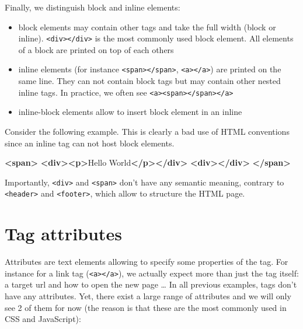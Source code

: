 \documentclass[
]{book}
\newenvironment{Shaded}{\begin{snugshade}}{\end{snugshade}}
\newcommand{\KeywordTok}[1]{\textcolor[rgb]{0.13,0.29,0.53}{\textbf{#1}}}
\newcommand{\NormalTok}[1]{#1}
\providecommand{\tightlist}{%
  \setlength{\itemsep}{0pt}\setlength{\parskip}{0pt}}
\begin{document}
Finally, we distinguish block and inline elements:

\begin{itemize}
\tightlist
\item
  block elements may contain other tags and take the full width (block or inline). \texttt{\textless{}div\textgreater{}\textless{}/div\textgreater{}} is the most commonly used block element. All elements of a block are printed on top of each others
\item
  inline elements (for instance \texttt{\textless{}span\textgreater{}\textless{}/span\textgreater{}}, \texttt{\textless{}a\textgreater{}\textless{}/a\textgreater{}}) are printed on the same line. They can not contain block tags but may contain other nested inline tags. In practice, we often see \texttt{\textless{}a\textgreater{}\textless{}span\textgreater{}\textless{}/span\textgreater{}\textless{}/a\textgreater{}}
\item
  inline-block elements allow to insert block element in an inline
\end{itemize}

Consider the following example. This is clearly a bad use of HTML conventions since an inline tag can not host block elements.

\begin{Shaded}
\begin{Highlighting}[]
\KeywordTok{<span>}
  \KeywordTok{<div><p>}\NormalTok{Hello World}\KeywordTok{</p></div>}
  \KeywordTok{<div></div>}
\KeywordTok{</span>}
\end{Highlighting}
\end{Shaded}

Importantly, \texttt{\textless{}div\textgreater{}} and \texttt{\textless{}span\textgreater{}} don't have any semantic meaning, contrary to \texttt{\textless{}header\textgreater{}} and \texttt{\textless{}footer\textgreater{}}, which allow to structure the HTML page.

\hypertarget{tag-attributes}{%
\section{Tag attributes}\label{tag-attributes}}

Attributes are text elements allowing to specify some properties of the tag. For instance for a link tag (\texttt{\textless{}a\textgreater{}\textless{}/a\textgreater{}}), we actually expect more than just the tag itself: a target url and how to open the new page \ldots{} In all previous examples, tags don't have any attributes. Yet, there exist a large range of attributes and we will only see 2 of them for now (the reason is that these are the most commonly used in CSS and JavaScript):
\end{document}

